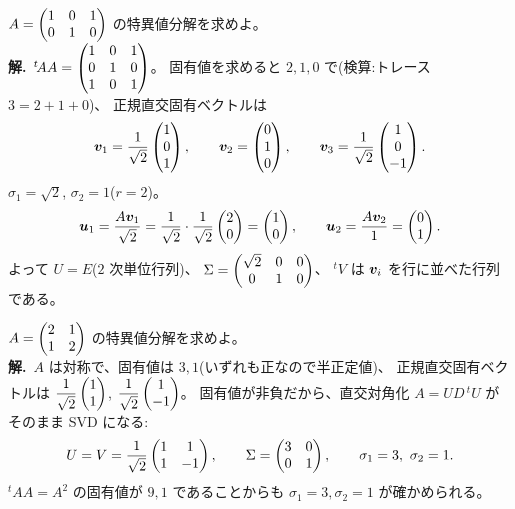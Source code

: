 \begin{rei}[例題・基本(長方形の行列)]\label{rei:svd-wide}
$A = \begin{pmatrix}1 & 0 & 1 \\ 0 & 1 & 0\end{pmatrix}$ の特異値分解を求めよ。\\
\textbf{解.}\ ${}^t\!AA = \begin{pmatrix}1 & 0 & 1 \\ 0 & 1 & 0 \\ 1 & 0 & 1\end{pmatrix}$。
固有値を求めると $2, 1, 0$ で(検算:トレース $3 = 2 + 1 + 0$)、
正規直交固有ベクトルは
\[
\bm{v}_1 = \frac{1}{\sqrt{2}}\begin{pmatrix}1 \\ 0 \\ 1\end{pmatrix}, \qquad
\bm{v}_2 = \begin{pmatrix}0 \\ 1 \\ 0\end{pmatrix}, \qquad
\bm{v}_3 = \frac{1}{\sqrt{2}}\begin{pmatrix}1 \\ 0 \\ -1\end{pmatrix}.
\]
$\sigma_1 = \sqrt{2}$, $\sigma_2 = 1$($r = 2$)。
\[
\bm{u}_1 = \frac{A\bm{v}_1}{\sqrt{2}}
= \frac{1}{\sqrt{2}}\cdot\frac{1}{\sqrt{2}}\begin{pmatrix}2 \\ 0\end{pmatrix} = \begin{pmatrix}1 \\ 0\end{pmatrix},
\qquad \bm{u}_2 = \frac{A\bm{v}_2}{1} = \begin{pmatrix}0 \\ 1\end{pmatrix}.
\]
よって $U = E$($2$ 次単位行列)、
$\Sigma = \begin{pmatrix}\sqrt{2} & 0 & 0 \\ 0 & 1 & 0\end{pmatrix}$、
${}^tV$ は $\bm{v}_i$ を行に並べた行列である。
\end{rei}

\begin{rei}[例題・基本(半正定値対称なら SVD $=$ 直交対角化)]\label{rei:svd-sym}
$A = \begin{pmatrix}2 & 1 \\ 1 & 2\end{pmatrix}$ の特異値分解を求めよ。\\
\textbf{解.}\ $A$ は対称で、固有値は $3, 1$(いずれも正なので半正定値)、
正規直交固有ベクトルは
$\dfrac{1}{\sqrt{2}}\begin{pmatrix}1 \\ 1\end{pmatrix}$, $\dfrac{1}{\sqrt{2}}\begin{pmatrix}1 \\ -1\end{pmatrix}$。
固有値が非負だから、直交対角化 $A = UD\,{}^tU$ がそのまま SVD になる:
\[
U = V = \frac{1}{\sqrt{2}}\begin{pmatrix}1 & 1 \\ 1 & -1\end{pmatrix}, \qquad
\Sigma = \begin{pmatrix}3 & 0 \\ 0 & 1\end{pmatrix}, \qquad \sigma_1 = 3,\ \sigma_2 = 1.
\]
${}^t\!AA = A^2$ の固有値が $9, 1$ であることからも
$\sigma_1 = 3, \sigma_2 = 1$ が確かめられる。
\end{rei}


